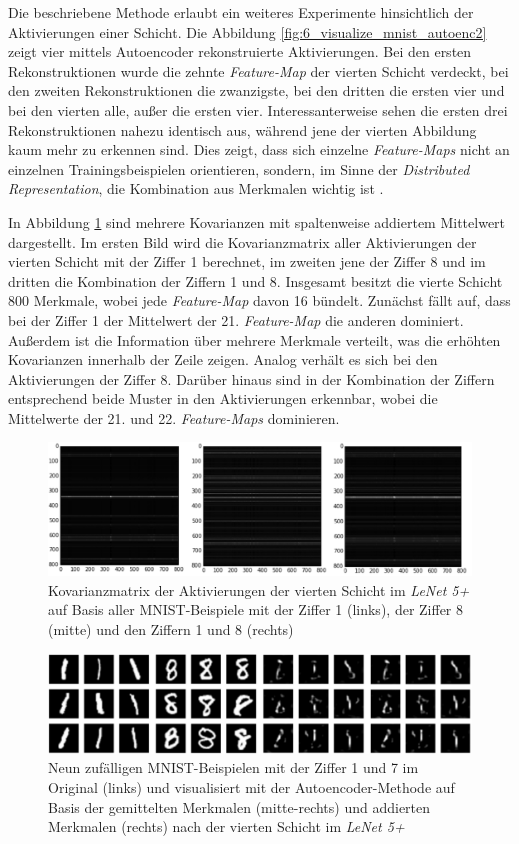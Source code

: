 Die beschriebene Methode erlaubt ein weiteres Experimente hinsichtlich der Aktivierungen einer Schicht.
Die Abbildung \ref{fig:6_visualize_mnist_autoenc2} zeigt vier mittels Autoencoder rekonstruierte Aktivierungen. Bei den ersten Rekonstruktionen wurde die zehnte \textit{Feature-Map} der vierten Schicht verdeckt, bei den zweiten Rekonstruktionen die zwanzigste, bei den dritten die ersten vier und bei den vierten alle, außer die ersten vier. Interessanterweise sehen die ersten drei Rekonstruktionen nahezu identisch aus, während jene der vierten Abbildung kaum mehr zu erkennen sind. Dies zeigt, dass sich einzelne \textit{Feature-Maps} nicht an einzelnen Trainingsbeispielen orientieren, sondern, im Sinne der \textit{Distributed Representation}, die Kombination aus Merkmalen wichtig ist \cite[vgl.][]{Hinton1986}.

In Abbildung \ref{fig:6_cov_mnist_1_8_18} sind mehrere Kovarianzen mit spaltenweise addiertem Mittelwert dargestellt. Im ersten Bild wird die Kovarianzmatrix aller Aktivierungen der vierten Schicht mit der Ziffer 1 berechnet, im zweiten jene der Ziffer 8 und im dritten die Kombination der Ziffern 1 und 8. Insgesamt besitzt die vierte Schicht 800 Merkmale, wobei jede \textit{Feature-Map} davon 16 bündelt.	
Zunächst fällt auf, dass bei der Ziffer 1 der Mittelwert der 21. \textit{Feature-Map} die anderen dominiert. Außerdem ist die Information über mehrere Merkmale verteilt, was die erhöhten Kovarianzen innerhalb der Zeile zeigen. Analog verhält es sich bei den Aktivierungen der Ziffer 8. Darüber hinaus sind in der Kombination der Ziffern entsprechend beide Muster in den Aktivierungen erkennbar, wobei die Mittelwerte der 21. und 22. \textit{Feature-Maps} dominieren.


\begin{figure}
\centering
\includegraphics[width=0.6\linewidth]{images/6_cov_mnist_1_8_18}
\caption[]{Kovarianzmatrix der Aktivierungen der vierten Schicht im \textit{LeNet 5+} auf Basis aller MNIST-Beispiele mit der Ziffer 1 (links), der Ziffer 8 (mitte) und den Ziffern 1 und 8 (rechts)}
\label{fig:6_cov_mnist_1_8_18}
\end{figure}

\begin{figure}
\centering
\includegraphics[width=0.6\linewidth]{images/6_visualize_mnist_autoenc_8_1}
\caption[]{Neun zufälligen MNIST-Beispielen mit der Ziffer 1 und 7 im Original (links) und visualisiert mit der Autoencoder-Methode auf Basis der gemittelten Merkmalen (mitte-rechts) und addierten Merkmalen (rechts) nach der vierten Schicht im \textit{LeNet 5+}}
\label{fig:6_visualize_mnist_autoenc_8_1}
\end{figure}


